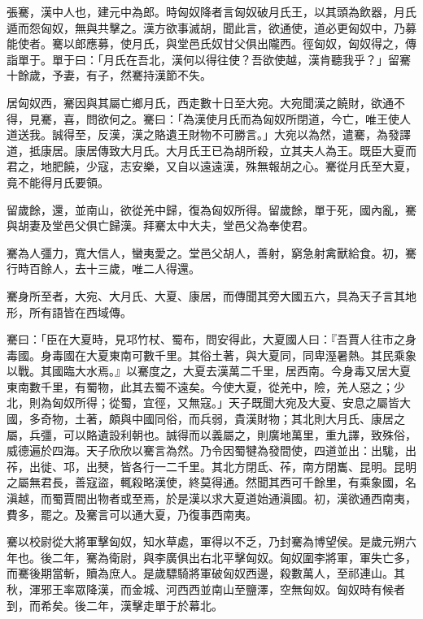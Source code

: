 
\begin{pinyinscope}
張騫，漢中人也，建元中為郎。時匈奴降者言匈奴破月氏王，以其頭為飲器，月氏遁而怨匈奴，無與共擊之。漢方欲事滅胡，聞此言，欲通使，道必更匈奴中，乃募能使者。騫以郎應募，使月氏，與堂邑氏奴甘父俱出隴西。徑匈奴，匈奴得之，傳詣單于。單于曰：「月氏在吾北，漢何以得往使？吾欲使越，漢肯聽我乎？」留騫十餘歲，予妻，有子，然騫持漢節不失。

居匈奴西，騫因與其屬亡鄉月氏，西走數十日至大宛。大宛聞漢之饒財，欲通不得，見騫，喜，問欲何之。騫曰：「為漢使月氏而為匈奴所閉道，今亡，唯王使人道送我。誠得至，反漢，漢之賂遺王財物不可勝言。」大宛以為然，遣騫，為發譯道，抵康居。康居傳致大月氏。大月氏王已為胡所殺，立其夫人為王。既臣大夏而君之，地肥饒，少寇，志安樂，又自以遠遠漢，殊無報胡之心。騫從月氏至大夏，竟不能得月氏要領。

留歲餘，還，並南山，欲從羌中歸，復為匈奴所得。留歲餘，單于死，國內亂，騫與胡妻及堂邑父俱亡歸漢。拜騫太中大夫，堂邑父為奉使君。

騫為人彊力，寬大信人，蠻夷愛之。堂邑父胡人，善射，窮急射禽獸給食。初，騫行時百餘人，去十三歲，唯二人得還。

騫身所至者，大宛、大月氏、大夏、康居，而傳聞其旁大國五六，具為天子言其地形，所有語皆在西域傳。

騫曰：「臣在大夏時，見邛竹杖、蜀布，問安得此，大夏國人曰：『吾賈人往市之身毒國。身毒國在大夏東南可數千里。其俗土著，與大夏同，同卑溼暑熱。其民乘象以戰。其國臨大水焉。』以騫度之，大夏去漢萬二千里，居西南。今身毒又居大夏東南數千里，有蜀物，此其去蜀不遠矣。今使大夏，從羌中，險，羌人惡之；少北，則為匈奴所得；從蜀，宜徑，又無寇。」天子既聞大宛及大夏、安息之屬皆大國，多奇物，土著，頗與中國同俗，而兵弱，貴漢財物；其北則大月氏、康居之屬，兵彊，可以賂遺設利朝也。誠得而以義屬之，則廣地萬里，重九譯，致殊俗，威德遍於四海。天子欣欣以騫言為然。乃令因蜀犍為發間使，四道並出：出駹，出莋，出徙、邛，出僰，皆各行一二千里。其北方閉氐、莋，南方閉巂、昆明。昆明之屬無君長，善寇盜，輒殺略漢使，終莫得通。然聞其西可千餘里，有乘象國，名滇越，而蜀賈間出物者或至焉，於是漢以求大夏道始通滇國。初，漢欲通西南夷，費多，罷之。及騫言可以通大夏，乃復事西南夷。

騫以校尉從大將軍擊匈奴，知水草處，軍得以不乏，乃封騫為博望侯。是歲元朔六年也。後二年，騫為衛尉，與李廣俱出右北平擊匈奴。匈奴圍李將軍，軍失亡多，而騫後期當斬，贖為庶人。是歲驃騎將軍破匈奴西邊，殺數萬人，至祁連山。其秋，渾邪王率眾降漢，而金城、河西西並南山至鹽澤，空無匈奴。匈奴時有候者到，而希矣。後二年，漢擊走單于於幕北。


\end{pinyinscope}
